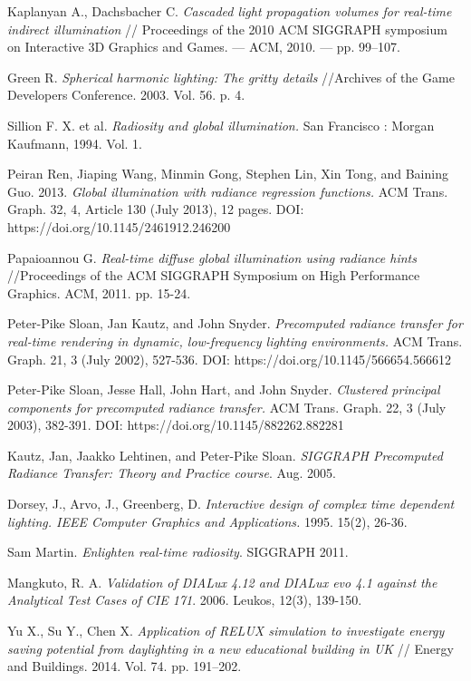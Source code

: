 \documentclass[oneside,final,12pt, a4paper]{extreport}
\begin{document}
\begin{thebibliography}{00}
 Kaplanyan A., Dachsbacher C. {\em Cascaded light propagation volumes for real-time indirect illumination} // Proceedings of the 2010 ACM SIGGRAPH symposium on Interactive 3D Graphics and Games. --- ACM, 2010. --- pp. 99--107.

 Green R. {\em Spherical harmonic lighting: The gritty details} //Archives of the Game Developers Conference. 2003. Vol. 56. p. 4.

 Sillion F. X. et al. {\em Radiosity and global illumination.} San Francisco : Morgan Kaufmann, 1994. Vol. 1.

 Peiran Ren, Jiaping Wang, Minmin Gong, Stephen Lin, Xin Tong, and Baining Guo. 2013. {\em Global illumination with radiance regression functions.} ACM Trans. Graph. 32, 4, Article 130 (July 2013), 12 pages. DOI: https://doi.org/10.1145/2461912.246200

 Papaioannou G. {\em Real-time diffuse global illumination using radiance hints} //Proceedings of the ACM SIGGRAPH Symposium on High Performance Graphics. ACM, 2011. pp. 15-24.

 Peter-Pike Sloan, Jan Kautz, and John Snyder. {\em Precomputed radiance transfer for real-time rendering in dynamic, low-frequency lighting environments.} ACM Trans. Graph. 21, 3 (July 2002), 527-536. DOI: https://doi.org/10.1145/566654.566612

 Peter-Pike Sloan, Jesse Hall, John Hart, and John Snyder. {\em Clustered principal components for precomputed radiance transfer.} ACM Trans. Graph. 22, 3 (July 2003), 382-391. DOI: https://doi.org/10.1145/882262.882281

 Kautz, Jan, Jaakko Lehtinen, and Peter-Pike Sloan. {\em SIGGRAPH Precomputed Radiance Transfer: Theory and Practice course}. Aug. 2005.

 Dorsey, J., Arvo, J., Greenberg, D. {\em Interactive design of complex time dependent lighting. IEEE Computer Graphics and Applications.} 1995. 15(2), 26-36.

 Sam Martin. {\em Enlighten real-time radiosity}. SIGGRAPH 2011.

 Mangkuto, R. A. {\em Validation of DIALux 4.12 and DIALux evo 4.1 against the Analytical Test Cases of CIE 171}. 2006. Leukos, 12(3), 139-150.

 Yu X., Su Y., Chen X. {\em Application of RELUX simulation to investigate energy saving potential from daylighting in a new educational building in UK } // Energy and Buildings. 2014. Vol. 74. pp. 191--202.

\end{thebibliography}
\end{document}
